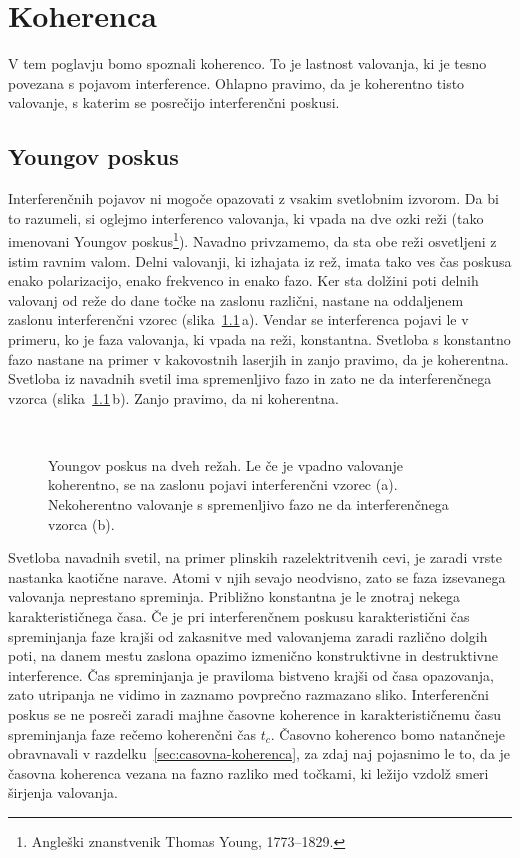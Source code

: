 
\chapter{Koherenca}

V tem poglavju bomo spoznali koherenco. To je lastnost
valovanja, ki je tesno povezana s pojavom interference. Ohlapno pravimo,
da je koherentno tisto valovanje, s katerim se posrečijo interferenčni
poskusi.  

\section{Youngov poskus}

Interferenčnih pojavov ni mogoče opazovati z
vsakim svetlobnim izvorom. Da bi to razumeli, si oglejmo interferenco
valovanja, ki vpada na dve ozki reži (tako imenovani Youngov 
poskus\footnote{Angleški znanstvenik Thomas Young, 1773--1829.}). 
Navadno privzamemo, da
sta obe reži osvetljeni z istim ravnim valom. Delni valovanji, ki
izhajata iz rež, imata tako ves čas poskusa enako polarizacijo, enako
frekvenco in enako fazo. Ker sta dolžini poti delnih valovanj od reže do dane 
točke na zaslonu različni, nastane na oddaljenem
zaslonu interferenčni vzorec (slika~\ref{fig:Young}\,a). Vendar se  
interferenca pojavi le v primeru,
ko je faza valovanja, ki vpada na reži, konstantna. Svetloba s konstantno
fazo nastane na primer v kakovostnih laserjih in zanjo pravimo, da je koherentna.
Svetloba iz navadnih svetil ima spremenljivo fazo in zato ne da
interferenčnega vzorca (slika~\ref{fig:Young}\,b). Zanjo pravimo, da ni koherentna. 
\begin{figure}[ht]
\centering
\def\svgwidth{100truemm} 
\\
\caption{Youngov poskus na dveh režah. Le če je vpadno valovanje koherentno, 
se na zaslonu pojavi interferenčni vzorec (a). Nekoherentno valovanje s spremenljivo
fazo ne da interferenčnega vzorca (b).}
\label{fig:Young}
\end{figure}

Svetloba navadnih svetil, na primer plinskih razelektritvenih cevi, 
je zaradi vrste nastanka kaotične narave. 
Atomi v njih sevajo neodvisno, zato se faza izsevanega valovanja neprestano
spreminja. Približno konstantna je le znotraj nekega karakterističnega
časa. Če je pri interferenčnem poskusu karakteristični čas spreminjanja
faze krajši od zakasnitve med valovanjema zaradi različno
dolgih poti, na danem mestu zaslona opazimo izmenično konstruktivne in 
destruktivne interference. Čas spreminjanja je praviloma
bistveno krajši od časa opazovanja, zato utripanja ne vidimo in 
zaznamo povprečno razmazano sliko. Interferenčni poskus se ne 
posreči zaradi majhne časovne koherence in
karakterističnemu času spreminjanja faze rečemo 
koherenčni čas
$t_{c}$. Časovno koherenco bomo natančneje obravnavali v 
razdelku~\ref{sec:casovna-koherenca}, za zdaj naj pojasnimo le to, da je časovna
koherenca vezana na fazno razliko med točkami, ki ležijo
vzdolž smeri širjenja valovanja. 

